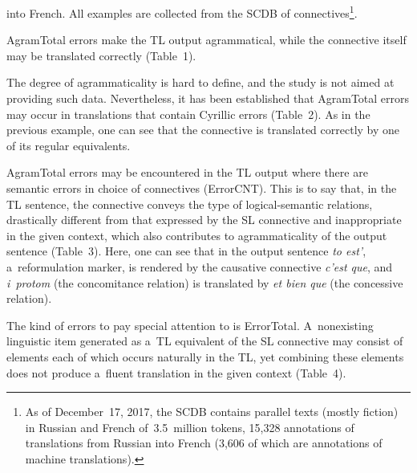 \begin{multicols}{2}

\noindent
 into French. All examples are collected from 
the SCDB
 of connectives\footnote{As of December~17, 2017, the SCDB contains parallel texts 
(mostly fiction) in Russian and French of~3.5~million tokens, 15,328 annotations of translations from 
Russian into French (3,606 of which are annotations of machine translations).}.
  
  AgramTotal errors make the TL output agrammatical, while the connective itself 
may be translated correctly (Table~1).

  The degree of agrammaticality is hard to define, and the study is not aimed at 
providing such data. Nevertheless, it has been established that AgramTotal errors 
may occur in translations that contain Cyrillic errors (Table~2).
  As in the previous example, one can see that the connective is translated 
correctly by one of its regular equivalents.
  
  AgramTotal errors may be encountered in the TL output where there are 
semantic errors in choice of connectives (ErrorCNT). This is to say that, in the TL 
sentence, the connective conveys the type of logical-semantic relations, drastically 
different from that expressed by the SL connective and inappropriate in the given 
context, which also contributes to agrammaticality of the output sentence 
(Table~3).
    Here, one can see that in the output sentence \textit{to est'}, a~reformulation 
marker, is rendered by the causative connective \textit{c'est que}, and 
\textit{i~protom} (the concomitance relation) is translated by \textit{et bien que} 
(the concessive relation).
  
  The kind of errors to pay special attention to is \mbox{ErrorTotal}. A~nonexisting 
linguistic item generated as a~TL equivalent of the SL connective may consist of 
elements each of which occurs naturally in the TL, yet combining these elements 
does not produce a~fluent translation in the given context (Table~4).
  
 \begin{table*}\small %
  \begin{center}
  \vspace*{2ex}
  

\end{center}
\end{table*}
\end{multicols}

